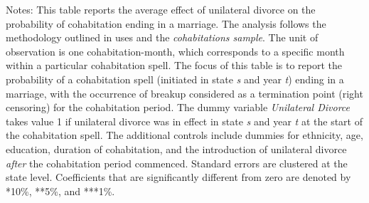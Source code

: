 \begin{table}[H]\centering                                  \scriptsize                                 \caption{The average effect of unilateral divorce on the probability that a cohabitation spell ends in a marriage. Unit of observation: cohabitation-month}                                   \label{tab:tabdurm}                                 
\begin{minipage}{\textwidth}
\scriptsize\smallskip
Notes: This table reports the average effect of unilateral divorce on the probability of cohabitation ending in a marriage. The analysis follows the methodology outlined in \cite{borusyak2021} uses and the \textit{cohabitations sample}. The unit of observation is one cohabitation-month, which corresponds to a specific month within a particular cohabitation spell. The focus of this table is to report the probability of a cohabitation spell (initiated in state \textit{s} and year \textit{t}) ending in a marriage, with the occurrence of breakup considered as a termination point (right censoring) for the cohabitation period. The dummy variable \textit{Unilateral Divorce} takes value 1 if unilateral divorce was in effect in state \textit{s} and year \textit{t} at the start of the cohabitation spell. The additional controls include dummies for ethnicity, age, education, duration of cohabitation, and the introduction of unilateral divorce \textit{after} the cohabitation period commenced. Standard errors are clustered at the state level. Coefficients that are significantly different from zero are denoted by *10\%, **5\%, and ***1\%.
\\
\end{minipage}
\end{table}
